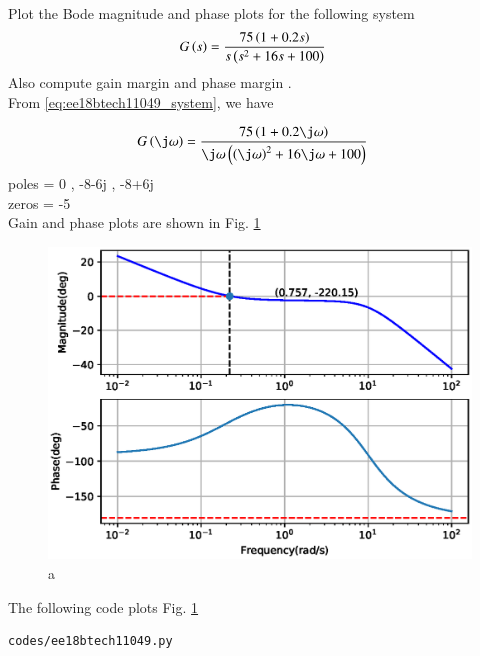 
\item Plot the Bode magnitude and phase plots for the following system
\begin{align}
G\left(s\right) &= \frac{75\left(1+0.2s\right)}{s\left(s^2+16s+100\right)}
\label{eq:ee18btech11049_system}
\end{align}
Also compute gain margin and phase margin .
\\
\solution From  \eqref{eq:ee18btech11049_system}, we have 

\begin{align}
G\brak{\j\omega}&=\frac{75\brak{1+0.2\j\omega}}{\j\omega\brak{\brak{\j\omega}^2 + 16\j\omega+100} }
\end{align}
poles = 0 , -8-6j , -8+6j\\
zeros = -5\\
Gain and phase plots are shown in Fig.  \ref{fig:ee18btech11049} 
\begin{figure}[!h]
\centering
  \includegraphics[width=\columnwidth]{./figs/ee18btech11049.eps}
  \caption{a}
  \label{fig:ee18btech11049}
\end{figure}

The following code plots Fig. \ref{fig:ee18btech11049} 

\begin{lstlisting}
codes/ee18btech11049.py
\end{lstlisting}

